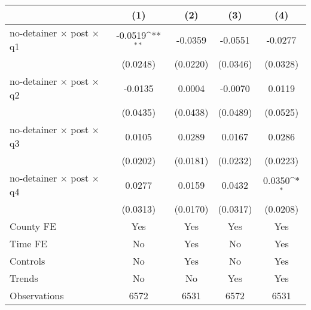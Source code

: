 {
\def\sym#1{\ifmmode^{#1}\else\(^{#1}\)\fi}
\begin{tabular*}{0.7\textwidth}{@{\hskip\tabcolsep\extracolsep\fill}l*{4}{c}}
\hline\hline
                    &\multicolumn{1}{c}{(1)}         &\multicolumn{1}{c}{(2)}         &\multicolumn{1}{c}{(3)}         &\multicolumn{1}{c}{(4)}         \\
\hline
no-detainer $\times$ post $\times$ q1&     -0.0519\sym{**} &     -0.0359         &     -0.0551         &     -0.0277         \\
                    &    (0.0248)         &    (0.0220)         &    (0.0346)         &    (0.0328)         \\
[1em]
no-detainer $\times$ post $\times$ q2&     -0.0135         &      0.0004         &     -0.0070         &      0.0119         \\
                    &    (0.0435)         &    (0.0438)         &    (0.0489)         &    (0.0525)         \\
[1em]
no-detainer $\times$ post $\times$ q3&      0.0105         &      0.0289         &      0.0167         &      0.0286         \\
                    &    (0.0202)         &    (0.0181)         &    (0.0232)         &    (0.0223)         \\
[1em]
no-detainer $\times$ post $\times$ q4&      0.0277         &      0.0159         &      0.0432         &      0.0350\sym{*}  \\
                    &    (0.0313)         &    (0.0170)         &    (0.0317)         &    (0.0208)         \\
[1em]
County FE           &         Yes         &         Yes         &         Yes         &         Yes         \\
[1em]
Time FE             &          No         &         Yes         &          No         &         Yes         \\
[1em]
Controls            &          No         &         Yes         &          No         &         Yes         \\
[1em]
Trends              &          No         &          No         &         Yes         &         Yes         \\
\hline
Observations        &        6572         &        6531         &        6572         &        6531         \\
\hline\hline
\end{tabular*}
}
